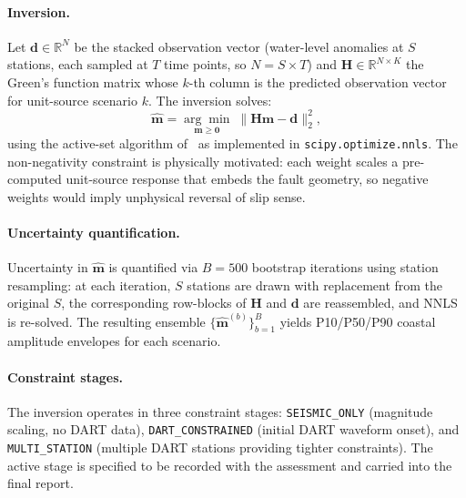 \documentclass{article}
\begin{document}
\paragraph{Inversion.}
Let $\mathbf{d} \in \mathbb{R}^N$ be the stacked observation vector
(water-level anomalies at $S$ stations, each sampled at $T$ time points,
so $N = S \times T$) and $\mathbf{H} \in \mathbb{R}^{N \times K}$ the
Green's function matrix whose $k$-th column is the predicted observation
vector for unit-source scenario $k$.
The inversion solves:
\begin{equation}
  \hat{\mathbf{m}} = \underset{\mathbf{m} \geq \mathbf{0}}
    {\arg\min}\;\|\mathbf{H}\mathbf{m} - \mathbf{d}\|_2^2,
  \label{eq:nnls}
\end{equation}
using the active-set algorithm of~\citet{lawson1974solving} as
implemented in \texttt{scipy.optimize.nnls}. The non-negativity
constraint is physically motivated: each weight scales a
pre-computed unit-source response that embeds the fault geometry,
so negative weights would imply unphysical reversal of slip sense.

\paragraph{Uncertainty quantification.}
Uncertainty in $\hat{\mathbf{m}}$ is quantified via $B=500$ bootstrap
iterations using station resampling: at each iteration, $S$ stations are
drawn with replacement from the original $S$, the corresponding row-blocks
of $\mathbf{H}$ and $\mathbf{d}$ are reassembled, and NNLS is re-solved.
The resulting ensemble $\{\hat{\mathbf{m}}^{(b)}\}_{b=1}^B$
yields P10/P50/P90 coastal amplitude envelopes for each scenario.

\paragraph{Constraint stages.}
The inversion operates in three constraint stages:
\texttt{SEISMIC\_ONLY} (magnitude scaling, no DART data),
\texttt{DART\_CONSTRAINED} (initial DART waveform onset), and
\texttt{MULTI\_STATION} (multiple DART stations providing tighter
constraints). The active stage is specified to be recorded with the
assessment and carried into the final report.
\end{document}
